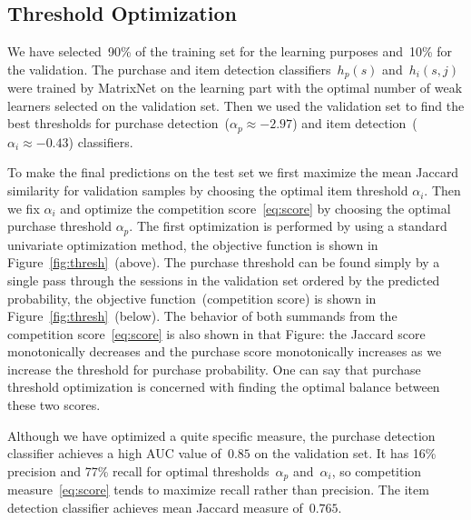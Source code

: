 \documentclass{sig-alternate}
\begin{document}
\subsection{Threshold Optimization}
We have selected~90\% of the training set for the learning purposes
and~10\% for the validation.
The purchase and item detection classifiers~$h_p(s)$ and~$h_i(s, j)$
were trained by MatrixNet on the learning part with the optimal
number of weak learners selected on the validation set.
Then we used the validation set to find the best thresholds
for purchase detection~($\alpha_p \approx -2.97$) and item detection~($\alpha_i \approx -0.43$) classifiers.

To make the final predictions on the test set we first maximize the mean Jaccard similarity
for validation samples by choosing the optimal item threshold $\alpha_i$.
Then we fix $\alpha_i$ and optimize the competition score~\eqref{eq:score}
by choosing the optimal purchase threshold $\alpha_p$.
The first optimization is performed by using a standard univariate optimization method,
the objective function is shown in Figure~\ref{fig:thresh}~(above).
The purchase threshold can be found simply by a single pass through the sessions
in the validation set ordered by the predicted probability,
the objective function~(competition score) is shown in Figure~\ref{fig:thresh}~(below).
The behavior of both summands from the competition score~\eqref{eq:score}
is also shown in that Figure: the Jaccard score monotonically decreases
and the purchase score monotonically increases as we increase the threshold for
purchase probability.
One can say that purchase threshold optimization is concerned with finding
the optimal balance between these two scores.

Although we have optimized a quite specific measure,
the purchase detection classifier achieves a high AUC value of~$0.85$
on the validation set.
It has 16\% precision and 77\% recall for optimal thresholds~$\alpha_p$ and~$\alpha_i$,
so competition measure~\eqref{eq:score}
tends to maximize recall rather than precision.
The item detection classifier achieves mean Jaccard measure of~$0.765$.
\end{document}
